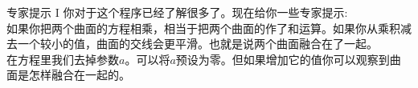 ﻿\begin{surferPage}{专家提示 I}
你对于这个程序已经了解很多了。现在给你一些专家提示:\\
\vspace{0.3cm}
如果你把两个曲面的方程相乘，相当于把两个曲面的作了和运算。如果你从乘积减去一个较小的值，曲面的交线会更平滑。也就是说两个曲面融合在了一起。\\
\vspace{0.3cm}
在方程里我们去掉参数$a$。可以将$a$预设为零。但如果增加它的值你可以观察到曲面是怎样融合在一起的。
\end{surferPage}
